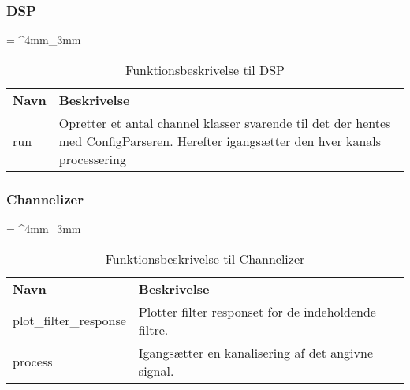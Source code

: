 \begin{appendices}
\subsubsection{DSP}
\begin{table}[H]
	\renewcommand{\arraystretch}{2}
	\centering
	\sffamily
	\tabulinesep = ^4mm_3mm
	\begin{tabu}{ m{4cm}  m{8.5cm} }
		\color{white}\bfseries Navn &\color{white}\bfseries Beskrivelse \\
		run & Opretter et antal channel klasser svarende til det der hentes med ConfigParseren. Herefter igangsætter den hver kanals processering \\
	\end{tabu}
	\caption{Funktionsbeskrivelse til DSP}
	\label{tab:func_descr_DSP}
\end{table}

\subsubsection{Channelizer}
\begin{table}[H]
	\renewcommand{\arraystretch}{2}
	\centering
	\sffamily
	\tabulinesep = ^4mm_3mm
	\begin{tabu}{ m{4cm}  m{8.5cm} }
		\color{white}\bfseries Navn &\color{white}\bfseries Beskrivelse \\
		plot\_filter\_response 	& Plotter filter responset for de indeholdende filtre. \\
		process 				& Igangsætter en kanalisering af det angivne signal. \\
	\end{tabu}
	\caption{Funktionsbeskrivelse til Channelizer}
	\label{tab:func_descr_channelizer}
\end{table}
\pagebreak 


\end{appendices}
